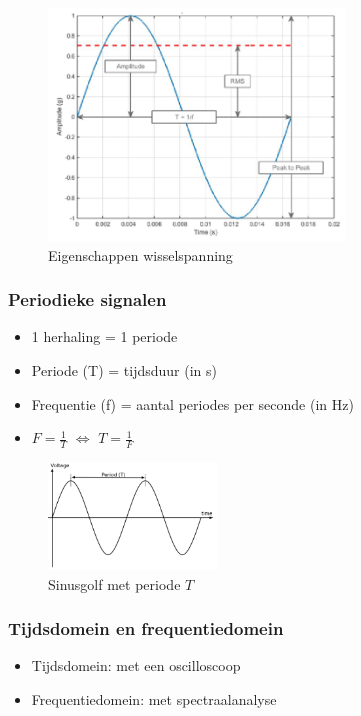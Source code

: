 \documentclass{article}
\begin{document}
\begin{figure}[H]
    \centering
    \includegraphics[width=0.7\textwidth]{Screenshot_20200217_121136.png}
    \caption{Eigenschappen wisselspanning}
\end{figure}

\subsubsection{Periodieke signalen}
\begin{itemize}
    \item 1 herhaling = 1 periode
    \item Periode (T) = tijdsduur (in s)
    \item Frequentie (f) = aantal periodes per seconde (in Hz)
    \item $F = \frac1T$ $\Leftrightarrow$ $T = \frac1F$
\end{itemize}

\begin{figure}[H]
    \centering
    \includegraphics[width=0.4\textwidth]{Screenshot_20200217_122002.png}
    \caption{Sinusgolf met periode $T$}
\end{figure}


\subsubsection{Tijdsdomein en frequentiedomein}
\begin{itemize}
    \item Tijdsdomein: met een oscilloscoop
    \item Frequentiedomein: met spectraalanalyse 
\end{itemize}
\end{document}

